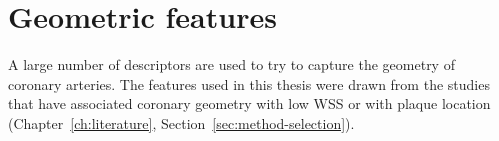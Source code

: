 \providecommand{\clarify}[1]{\textcolor{red}{\textbf{Clarification needed:} #1}}
\section{Geometric features}
\label{sec:method-features}

A large number of descriptors are used to try to capture the geometry of coronary arteries.
The features used in this thesis were drawn from the studies that have associated coronary geometry with low WSS or with plaque location (Chapter~\ref{ch:literature}, Section~\ref{sec:method-selection}).



